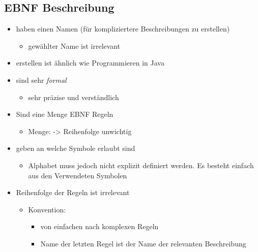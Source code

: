 \documentclass[11pt]{article}
\begin{document}
\subsection{EBNF Beschreibung}
\label{sec:org0558326}
\begin{itemize}
\item haben einen Namen (für kompliziertere Beschreibungen zu erstellen)\\
\begin{itemize}
\item gewählter Name ist irrelevant\\
\end{itemize}
\item erstellen ist ähnlich wie Programmieren in Java\\
\item sind sehr \emph{formal} \\
\begin{itemize}
\item sehr präzise und verständlich\\
\end{itemize}
\item Sind eine Menge EBNF Regeln\\
\begin{itemize}
\item Menge: -> Reihenfolge unwichtig\\
\end{itemize}
\item geben an welche Symbole erlaubt sind\\
\begin{itemize}
\item Alphabet muss jedoch nicht explizit definiert werden. Es besteht einfach aus den Verwendeten Symbolen\\
\end{itemize}
\item Reihenfolge der Regeln ist irrelevant\\
\begin{itemize}
\item Konvention:\\
\begin{itemize}
\item von einfachen nach komplexen Regeln\\
\item Name der letzten Regel ist der Name der relevanten Beschreibung\\
\end{itemize}
\end{itemize}
\end{itemize}
\end{document}
